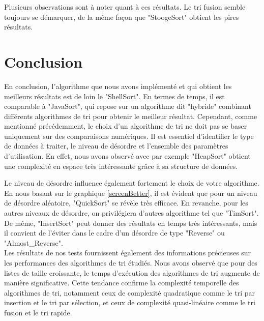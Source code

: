 \documentclass[a4paper,12pt]{article}
\begin{document}
    
    
    Plusieurs observations sont à noter quant à ces résultats. Le tri fusion semble toujours se démarquer, de la même façon que "StoogeSort" obtient les pires résultats. 
\section{Conclusion}
En conclusion, l'algorithme que nous avons implémenté et qui obtient les meilleurs résultats est de loin le "ShellSort". En termes de temps, il est comparable à "JavaSort", qui repose sur un algorithme dit "hybride" combinant différents algorithmes de tri pour obtenir le meilleur résultat. Cependant, comme mentionné précédemment, le choix d'un algorithme de tri ne doit pas se baser uniquement sur des comparaisons numériques. Il est essentiel d'identifier le type de données à traiter, le niveau de désordre et l'ensemble des paramètres d'utilisation. En effet, nous avons observé avec par exemple "HeapSort" obtient une complexité en espace très intéressante grâce à sa structure de données.

Le niveau de désordre influence également fortement le choix de votre algorithme. En nous basant sur le graphique \ref{screenBetter}, il est évident que pour un niveau de désordre aléatoire, "QuickSort" se révèle très efficace. En revanche, pour les autres niveaux de désordre, on privilégiera d'autres algorithme tel que "TimSort". De même, "InsertSort"  peut donner des résultats en temps très intéressants, mais il convient de l'éviter dans le cadre d'un désordre de type "Reverse" ou "Almost\_Reverse".\\


Les résultats de nos tests fournissent également des informations précieuses sur les performances des algorithmes de tri étudiés. Nous avons observé que pour des listes de taille croissante, le temps d'exécution des algorithmes de tri augmente de manière significative. Cette tendance confirme la complexité temporelle des algorithmes de tri, notamment ceux de complexité quadratique comme le tri par insertion et le tri par sélection, et ceux de complexité quasi-linéaire comme le tri fusion et le tri rapide.
\end{document}
